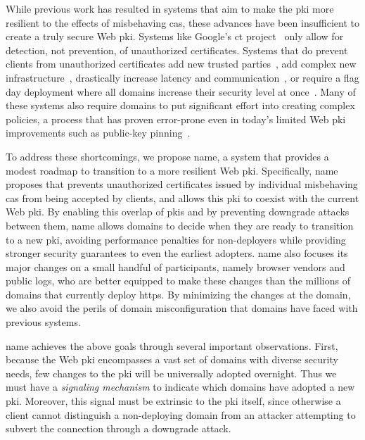 While previous work has resulted in systems that aim to make the \ac{pki} more
resilient to the effects of misbehaving \acp{ca}, these advances have been
insufficient to create a truly secure Web \ac{pki}. Systems like Google's
\ac{ct} project~\cite{rfc6962} only allow for detection, not prevention, of
unauthorized certificates. Systems that do prevent clients from unauthorized
certificates add new trusted parties~\cite{kim2013accountable}, add complex
new infrastructure~\cite{szalachowski2014policert}, drastically increase latency
and communication~\cite{yu2016dtki}, or require a flag day deployment where all
domains increase their security level at once~\cite{basin2014arpki}. Many of
these systems also require domains to put significant effort into creating
complex policies, a process that has proven error-prone even in today's limited
Web \ac{pki} improvements such as public-key pinning~\cite{palmer2017intent}.

To address these shortcomings, we propose \acs{name}, a system that provides a
modest roadmap to transition to a more resilient Web \ac{pki}. Specifically,
\ac{name} proposes  that prevents unauthorized certificates issued by
individual misbehaving \acp{ca} from being accepted by clients, and allows this
\ac{pki} to coexist with the current Web \ac{pki}. By enabling this overlap of
\acp{pki} and by preventing downgrade attacks between them, \ac{name} allows
domains to decide when they are ready to transition to a new \ac{pki}, avoiding
performance penalties for non-deployers while providing stronger security
guarantees to even the earliest adopters. \ac{name} also focuses its major
changes on a small handful of participants, namely browser vendors and public
logs, who are better equipped to make these changes than the millions of domains
that currently deploy \ac{https}. By minimizing the changes at the domain, we
also avoid the perils of domain misconfiguration that domains have faced with
previous systems.

\ac{name} achieves the above goals through several important observations.
First, because the Web \ac{pki} encompasses a vast set of domains with diverse
security needs, few changes to the \ac{pki} will be universally adopted
overnight. Thus we must have a \emph{signaling mechanism} to indicate which
domains have adopted a new \ac{pki}. Moreover, this signal must be extrinsic to
the \ac{pki} itself, since otherwise a client cannot distinguish a non-deploying
domain from an attacker attempting to subvert the connection through a downgrade
attack.

